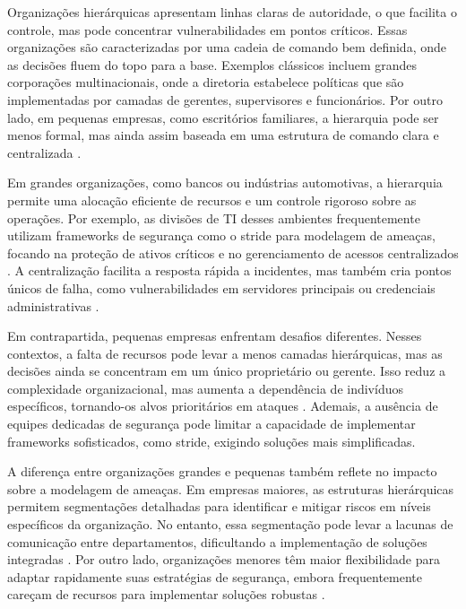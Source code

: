 Organizações hierárquicas apresentam linhas claras de autoridade, o que
facilita o controle, mas pode concentrar vulnerabilidades em pontos
críticos. Essas organizações são caracterizadas por uma cadeia de comando
bem definida, onde as decisões fluem do topo para a base. Exemplos
clássicos incluem grandes corporações multinacionais, onde a diretoria
estabelece políticas que são implementadas por camadas de gerentes,
supervisores e funcionários. Por outro lado, em pequenas empresas, como
escritórios familiares, a hierarquia pode ser menos formal, mas ainda assim
baseada em uma estrutura de comando clara e centralizada \cite{WorkerCooperativesinAmerica}.

Em grandes organizações, como bancos ou indústrias automotivas, a
hierarquia permite uma alocação eficiente de recursos e um controle
rigoroso sobre as operações. Por exemplo, as divisões de TI desses
ambientes frequentemente utilizam frameworks de segurança como o
\gls{stride} para modelagem de ameaças, focando na proteção de ativos
críticos e no gerenciamento de acessos centralizados
\cite{ThreatModelingASystematicLiteratureReview}. A centralização facilita
a resposta rápida a incidentes, mas também cria pontos únicos de falha,
como vulnerabilidades em servidores principais ou credenciais
administrativas \cite{DoArtifactsHavePolitics}.

Em contrapartida, pequenas empresas enfrentam desafios diferentes. Nesses
contextos, a falta de recursos pode levar a menos camadas hierárquicas, mas
as decisões ainda se concentram em um único proprietário ou gerente. Isso
reduz a complexidade organizacional, mas aumenta a dependência de
indivíduos específicos, tornando-os alvos prioritários em ataques
\cite{WorkerCooperativesinAmerica}. Ademais, a ausência de equipes
dedicadas de segurança pode limitar a capacidade de implementar frameworks
sofisticados, como \gls{stride}, exigindo soluções mais simplificadas.

A diferença entre organizações grandes e pequenas também reflete no impacto
sobre a modelagem de ameaças. Em empresas maiores, as estruturas
hierárquicas permitem segmentações detalhadas para identificar e mitigar
riscos em níveis específicos da organização. No entanto, essa segmentação
pode levar a lacunas de comunicação entre departamentos, dificultando a
implementação de soluções integradas
\cite{ThreatModelingASystematicLiteratureReview}. Por outro lado,
organizações menores têm maior flexibilidade para adaptar rapidamente suas
estratégias de segurança, embora frequentemente careçam de recursos para
implementar soluções robustas \cite{WorkerCooperativesandRevolution}.

